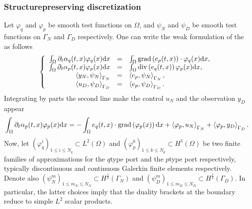 \documentclass[letterpaper,10pt,english]{sphinxmanual}
\begin{document}
\subsubsection{Structure\sphinxhyphen{}preserving discretization}
\label{\detokenize{examples/wave:structure-preserving-discretization}}
\sphinxAtStartPar
Let \(\varphi_q\) and \(\varphi_p\) be smooth test functions on
\(\Omega\), and \(\psi_N\) and \(\psi_D\) be smooth test
functions on \(\Gamma_N\) and \(\Gamma_D\) respectively. One can
write the weak formulation of the  as follows
\begin{equation}\label{equation:examples/wave:weak-form}
\begin{split}   \left\lbrace
   \begin{array}{rcl}
   \int_\Omega \partial_t \alpha_q(t,x) \varphi_q(x) {\rm d}x &=& \int_\Omega {\rm grad} \left( e_p(t,x) \right) \cdot \varphi_q(x) {\rm d}x, \\
   \int_\Omega \partial_t \alpha_p(t,x) \varphi_p(x) {\rm d}x &=& \int_\Omega {\rm div} \left( e_q(t,x) \right) \varphi_p(x) {\rm d}x, \\
   \left\langle y_N, \psi_N \right\rangle_{\Gamma_N} &=& \left\langle e_p, \psi_N \right\rangle_{\Gamma_N}, \\
   \left\langle u_D, \psi_D \right\rangle_{\Gamma_D} &=& \left\langle e_p, \psi_D \right\rangle_{\Gamma_D}.
   \end{array}
   \right.\end{split}
\end{equation}
\sphinxAtStartPar
Integrating by parts the second line make the control \(u_N\) and
the observation \(y_D\) appear
\begin{equation*}
\begin{split}\int_\Omega \partial_t \alpha_p(t,x) \varphi_p(x) {\rm d}x = - \int_\Omega e_q(t,x) \cdot {\rm grad} \left( \varphi_p(x) \right) {\rm d}x + \left\langle \varphi_p, u_N \right\rangle_{\Gamma_N} + \left\langle \varphi_p, y_D \right\rangle_{\Gamma_D}.\end{split}
\end{equation*}
\sphinxAtStartPar
Now, let \((\varphi_q^i)_{1 \le i \le N_q} \subset L^2(\Omega)\) and
\((\varphi_p^k)_{1 \le k \le N_p} \subset H^1(\Omega)\) be two
finite families of approximations for the \(q\)\sphinxhyphen{}type port and the
\(p\)\sphinxhyphen{}type port respectively, typically discontinuous and continuous
Galerkin finite elements respectively. Denote also
\((\psi_N^m)_{1 \le m_N \le N_N} \subset H^{\frac12}(\Gamma_N)\) and
\((\psi_D^m)_{1 \le m_D \le N_D} \subset H^{\frac12}(\Gamma_D)\). In
particular, the latter choices imply that the duality brackets at the
boundary reduce to simple \(L^2\) scalar products.
\end{document}
